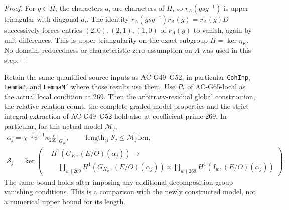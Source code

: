 \begin{proof}
For \(g\in H\), the characters \(a_i\) are
characters of \(H\), so \(r_A(gsg^{-1})\) is
upper triangular with diagonal \(d_i\).
The identity
\(r_A(gsg^{-1})r_A(g)=r_A(g)D\)
successively forces entries \((2,0),(2,1),(1,0)\)
of \(r_A(g)\) to vanish, again by unit
differences.  This is upper triangularity on
the exact subgroup \(H=\ker\eta_K\).
No domain, reducedness or characteristic-zero
assumption on \(A\) was used in this step.
\end{proof}

\begin{corollary}
\label{AC-G65-model}
Retain the same quantified source inputs as AC-G49--G52,
in particular \texttt{CohInp}, \texttt{LemmaP}, and
\texttt{LemmaM'} where those results use them.
Use \(P_*\) of AC-G65-local as the actual local condition
at \(269\).  Then the arbitrary-residual global
construction, the relative relation count, the complete
graded-model properties and the strict integral
extraction of AC-G49--G52 hold also at coefficient
prime \(269\).
In particular, for this actual model \(\mathcal M_j\),
\[
\begin{gathered}
 \alpha_j=\chi^{-j}\psi^{-1}\kappa_{269}^{-e}|_{G_K},
 \qquad \operatorname{length}_O\mathcal S_j
                    \leq\mathcal M_j.\mathrm{len},\\
 \mathcal S_j=\ker\!\left(
 \begin{aligned}
 &H^1(G_K,(E/O)(\alpha_j))\longrightarrow\\
 &\quad\prod_{w\mid269}H^1(G_{K_w},(E/O)(\alpha_j))
 \times\prod_{w\nmid269}H^1(I_w,(E/O)(\alpha_j))
 \end{aligned}\right).
\end{gathered}
 \tag{RC.20}
\]
The same bound holds after imposing any additional
decomposition-group vanishing conditions.
This is a comparison with the newly constructed
model, not a numerical upper bound for its length.
\end{corollary}
